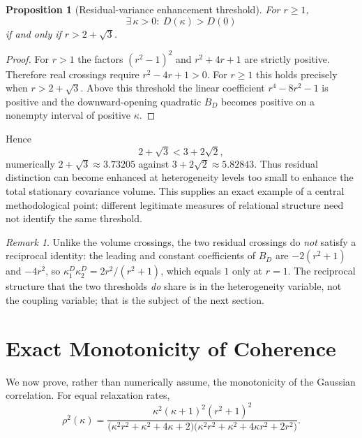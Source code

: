 \documentclass[11pt]{article}
\theoremstyle{plain}
\newtheorem{proposition}{Proposition}
\theoremstyle{remark}
\newtheorem{remark}{Remark}
\begin{document}
\begin{proposition}[Residual-variance enhancement threshold]\label{prop:resid}
For $r\ge1$,
\begin{equation}
  \exists\,\kappa>0:\ D(\kappa)>D(0) \label{eq:Dexists}
\end{equation}
if and only if $r>2+\sqrt3$.
\end{proposition}

\begin{proof}
For $r>1$ the factors $(r^2-1)^2$ and $r^2+4r+1$ are strictly positive. Therefore real
crossings require $r^2-4r+1>0$. For $r\ge1$ this holds precisely when $r>2+\sqrt3$. Above this
threshold the linear coefficient $r^4-8r^2-1$ is positive and the downward-opening quadratic
$B_D$ becomes positive on a nonempty interval of positive $\kappa$.
\end{proof}

Hence
\begin{equation}
  2+\sqrt3<3+2\sqrt2, \label{eq:order}
\end{equation}
numerically $2+\sqrt3\approx3.73205$ against $3+2\sqrt2\approx5.82843$. Thus residual
distinction can become enhanced at heterogeneity levels too small to enhance the total
stationary covariance volume. This supplies an exact example of a central methodological point:
different legitimate measures of relational structure need not identify the same threshold.

\begin{remark}
Unlike the volume crossings, the two residual crossings do \emph{not} satisfy a reciprocal
identity: the leading and constant coefficients of $B_D$ are $-2(r^2+1)$ and $-4r^2$, so
$\kappa_1^D\kappa_2^D=2r^2/(r^2+1)$, which equals $1$ only at $r=1$. The reciprocal structure
that the two thresholds \emph{do} share is in the heterogeneity variable, not the coupling
variable; that is the subject of the next section.
\end{remark}

\section{Exact Monotonicity of Coherence}

We now prove, rather than numerically assume, the monotonicity of the Gaussian correlation. For
equal relaxation rates,
\begin{equation}
  \rho^2(\kappa)=\frac{\kappa^2(\kappa+1)^2(r^2+1)^2}
    {\bigl(\kappa^2r^2+\kappa^2+4\kappa+2\bigr)\bigl(\kappa^2r^2+\kappa^2+4\kappa r^2+2r^2\bigr)} .
  \label{eq:rho2}
\end{equation}
\end{document}
